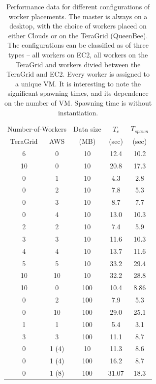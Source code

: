 \documentclass[conference,final]{IEEEtran}
\newcommand{\upp}{\vspace*{-0.5em}}
\begin{document}
\begin{table}
\upp
\begin{tabular}{ccccc}
  \hline
  \multicolumn{2}{c}{Number-of-Workers}  &  Data size   &  $T_c$  & $T_{spawn}$ \\   
  TeraGrid &  AWS &   (MB)  & (sec) & (sec)  \\
  \hline
  6 & 0 & 10  &  12.4 &  10.2 \\
  10 & 0 & 10  & 20.8 & 17.3 \\  
  \hline 
  0 & 1 & 10 & 4.3 & 2.8 \\
  0 & 2 & 10 & 7.8 & 5.3 \\ 
  0 & 3 & 10 & 8.7 & 7.7 \\
  0 & 4 & 10 & 13.0 & 10.3 \\
  \hline 
  2 & 2 & 10 & 7.4 & 5.9 \\
  3 & 3 & 10 & 11.6 & 10.3 \\
  4 & 4 & 10 & 13.7 & 11.6 \\
  5 & 5 & 10 & 33.2 & 29.4 \\ 
  10 & 10 & 10 & 32.2 & 28.8 \\
  \hline
  \hline 
  10 & 0 & 100 & 10.4 & 8.86 \\
  0 & 2 & 100 & 7.9 & 5.3 \\
  0 & 10 & 100 &  29.0 & 25.1 \\
  1 & 1 & 100 & 5.4 & 3.1 \\
  3 & 3 & 100 & 11.1 & 8.7 \\
  \hline \hline
  0 & 1 (4) & 10 &  11.3 & 8.6 \\
  0 & 1 (4) & 100 & 16.2 & 8.7 \\ 
  0 & 1 (8) & 100 & 31.07 & 18.3\\
  \hline \hline
\end{tabular}
\upp
\caption{Performance data for different configurations of worker placements. The master is always on a desktop, with the choice of workers placed on either Clouds or on the TeraGrid (QueenBee). The configurations can be classified as of three types -- all workers on EC2, all workers on the TeraGrid and workers divied between the TeraGrid and EC2. Every worker is assigned to a unique  VM. It is interesting to note the significant spawning times, and its dependence on the number of VM. Spawning time is without instantiation.}
\label{stuff}
\upp
\upp
\end{table}
\end{document}
